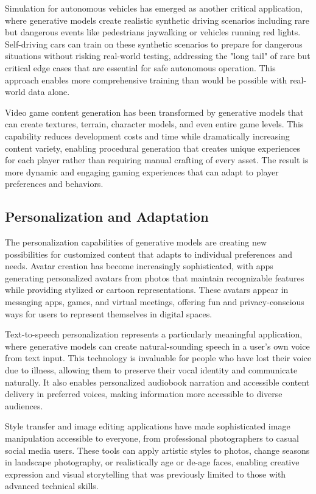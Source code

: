 Simulation for autonomous vehicles has emerged as another critical application, where generative models create realistic synthetic driving scenarios including rare but dangerous events like pedestrians jaywalking or vehicles running red lights. Self-driving cars can train on these synthetic scenarios to prepare for dangerous situations without risking real-world testing, addressing the "long tail" of rare but critical edge cases that are essential for safe autonomous operation. This approach enables more comprehensive training than would be possible with real-world data alone.

Video game content generation has been transformed by generative models that can create textures, terrain, character models, and even entire game levels. This capability reduces development costs and time while dramatically increasing content variety, enabling procedural generation that creates unique experiences for each player rather than requiring manual crafting of every asset. The result is more dynamic and engaging gaming experiences that can adapt to player preferences and behaviors.

\subsection{Personalization and Adaptation}

The personalization capabilities of generative models are creating new possibilities for customized content that adapts to individual preferences and needs. Avatar creation has become increasingly sophisticated, with apps generating personalized avatars from photos that maintain recognizable features while providing stylized or cartoon representations. These avatars appear in messaging apps, games, and virtual meetings, offering fun and privacy-conscious ways for users to represent themselves in digital spaces.

Text-to-speech personalization represents a particularly meaningful application, where generative models can create natural-sounding speech in a user's own voice from text input. This technology is invaluable for people who have lost their voice due to illness, allowing them to preserve their vocal identity and communicate naturally. It also enables personalized audiobook narration and accessible content delivery in preferred voices, making information more accessible to diverse audiences.

Style transfer and image editing applications have made sophisticated image manipulation accessible to everyone, from professional photographers to casual social media users. These tools can apply artistic styles to photos, change seasons in landscape photography, or realistically age or de-age faces, enabling creative expression and visual storytelling that was previously limited to those with advanced technical skills.

